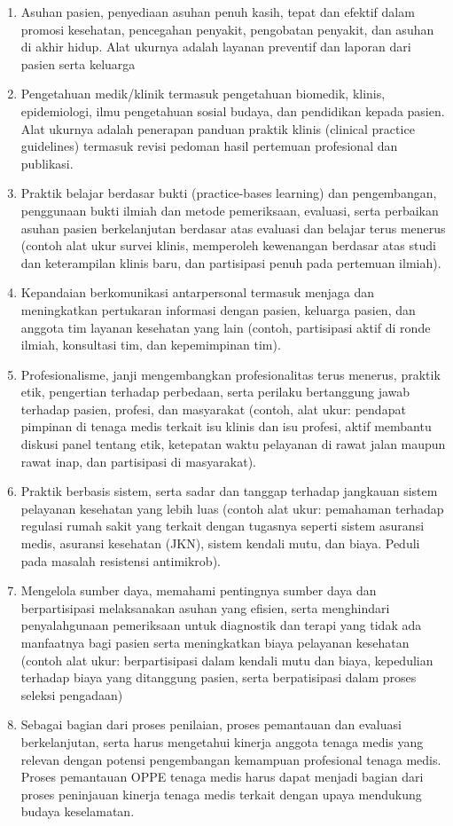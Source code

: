 \documentclass[
]{book}
\providecommand{\tightlist}{%
  \setlength{\itemsep}{0pt}\setlength{\parskip}{0pt}}
\begin{document}
\begin{enumerate}
\def\labelenumi{\arabic{enumi}.}
\tightlist
\item
  Asuhan pasien, penyediaan asuhan penuh kasih, tepat dan efektif dalam promosi kesehatan, pencegahan penyakit, pengobatan penyakit, dan asuhan di akhir hidup. Alat ukurnya adalah layanan preventif dan laporan dari pasien serta keluarga
\item
  Pengetahuan medik/klinik termasuk pengetahuan biomedik, klinis, epidemiologi, ilmu pengetahuan sosial budaya, dan pendidikan kepada pasien. Alat ukurnya adalah penerapan panduan praktik klinis (clinical practice guidelines) termasuk revisi pedoman hasil pertemuan profesional dan publikasi.
\item
  Praktik belajar berdasar bukti (practice-bases learning) dan pengembangan, penggunaan bukti ilmiah dan metode pemeriksaan, evaluasi, serta perbaikan asuhan pasien berkelanjutan berdasar atas evaluasi dan belajar terus menerus (contoh alat ukur survei klinis, memperoleh kewenangan berdasar atas studi dan keterampilan klinis baru, dan partisipasi penuh pada pertemuan ilmiah).
\item
  Kepandaian berkomunikasi antarpersonal termasuk menjaga dan meningkatkan pertukaran informasi dengan pasien, keluarga pasien, dan anggota tim layanan kesehatan yang lain (contoh, partisipasi aktif di ronde ilmiah, konsultasi tim, dan kepemimpinan tim).
\item
  Profesionalisme, janji mengembangkan profesionalitas terus menerus, praktik etik, pengertian terhadap perbedaan, serta perilaku bertanggung jawab terhadap pasien, profesi, dan masyarakat (contoh, alat ukur: pendapat pimpinan di tenaga medis terkait isu klinis dan isu profesi, aktif membantu diskusi panel tentang etik, ketepatan waktu pelayanan di rawat jalan maupun rawat inap, dan partisipasi di masyarakat).
\item
  Praktik berbasis sistem, serta sadar dan tanggap terhadap jangkauan sistem pelayanan kesehatan yang lebih luas (contoh alat ukur: pemahaman terhadap regulasi rumah sakit yang terkait dengan tugasnya seperti sistem asuransi medis, asuransi kesehatan (JKN), sistem kendali mutu, dan biaya. Peduli pada masalah resistensi antimikrob).
\item
  Mengelola sumber daya, memahami pentingnya sumber daya dan berpartisipasi melaksanakan asuhan yang efisien, serta menghindari penyalahgunaan pemeriksaan untuk diagnostik dan terapi yang tidak ada manfaatnya bagi pasien serta meningkatkan biaya pelayanan kesehatan (contoh alat ukur: berpartisipasi dalam kendali mutu dan biaya, kepedulian terhadap biaya yang ditanggung pasien, serta berpatisipasi dalam proses seleksi pengadaan)
\item
  Sebagai bagian dari proses penilaian, proses pemantauan dan evaluasi berkelanjutan, serta harus mengetahui kinerja anggota tenaga medis yang relevan dengan potensi pengembangan kemampuan profesional tenaga medis.
  Proses pemantauan OPPE tenaga medis harus dapat menjadi bagian dari proses peninjauan kinerja tenaga medis terkait dengan upaya mendukung budaya keselamatan.
\end{enumerate}
\end{document}
